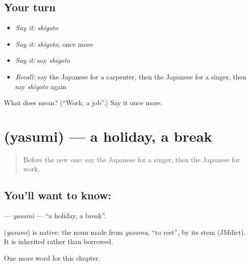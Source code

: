 \subsection*{Your turn}
\begin{itemize}
\raggedright
  \item \emph{Say it:} \emph{shigoto}
  \item \emph{Say it:} \emph{shigoto}, once more
  \item \emph{Say it:} say \emph{shigoto}
  \item \emph{Recall:} say the Japanese for a carpenter, then the Japanese for a singer, then say \emph{shigoto} again
\end{itemize}

\begin{tcolorbox}[breakable,colback=teal!4,colframe=teal!35!black,title={Before you move on}]
What does  mean? (\textquotedblleft{}Work, a job\textquotedblright{}.) Say it once more.
\end{tcolorbox}
\section[\texorpdfstring{\ja{やすみ} (yasumi)}{やすみ (yasumi)}]{ (yasumi) — a holiday, a break}

\label{lesson:JA-C112-yasumi}



\begin{quote}
Before the new one: say the Japanese for a singer, then the Japanese for work.
\end{quote}

\subsection*{You'll want to know: }
\textbf{} — \emph{yasumi} — \textquotedblleft{}a holiday, a break\textquotedblright{}.

\begin{cousinweb}
\textbf{} (\emph{yasumi}) is native: the noun made from \emph{yasumu}, \textquotedblleft{}to rest\textquotedblright{}, by its stem (JMdict). It is inherited rather than borrowed.
\end{cousinweb}

\begin{grammarlens}[title={What you've built}]
One more word for this chapter.
\end{grammarlens}

